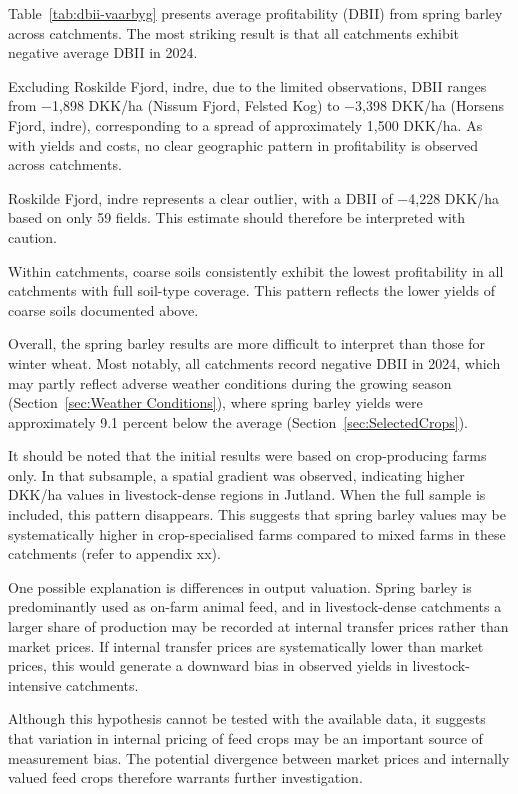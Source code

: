 \documentclass[12pt]{article}
\begin{document}
Table~\ref{tab:dbii-vaarbyg} presents average profitability (DBII) from spring barley across catchments. The most striking result is that all catchments exhibit negative average DBII in 2024. 

Excluding Roskilde Fjord, indre, due to the limited observations, DBII ranges from −1,898 DKK/ha (Nissum Fjord, Felsted Kog) to −3,398 DKK/ha (Horsens Fjord, indre), corresponding to a spread of approximately 1,500 DKK/ha. As with yields and costs, no clear geographic pattern in profitability is observed across catchments.

Roskilde Fjord, indre represents a clear outlier, with a DBII of −4,228 DKK/ha based on only 59 fields. This estimate should therefore be interpreted with caution.

Within catchments, coarse soils consistently exhibit the lowest profitability in all catchments with full soil-type coverage. This pattern reflects the lower yields of coarse soils documented above.

Overall, the spring barley results are more difficult to interpret than those for winter wheat. Most notably, all catchments record negative DBII in 2024, which may partly reflect adverse weather conditions during the growing season (Section~\ref{sec:Weather Conditions}), where spring barley yields were approximately 9.1 percent below the average (Section~\ref{sec:SelectedCrops}). 

 

It should be noted that the initial results were based on crop-producing farms only. In that subsample, a spatial gradient was  observed, indicating higher DKK/ha values in livestock-dense regions in Jutland. When the full sample is included, this pattern disappears. This suggests that spring barley values may be systematically higher in crop-specialised farms compared to mixed farms in these catchments (refer to appendix xx).

One possible explanation is differences in output valuation. Spring barley is predominantly used as on-farm animal feed, and in livestock-dense catchments a larger share of production may be recorded at internal transfer prices rather than market prices. If internal transfer prices are systematically lower than market prices, this would generate a downward bias in observed yields in livestock-intensive catchments.

Although this hypothesis cannot be tested with the available data, it suggests that variation in internal pricing of feed crops may be an important source of measurement bias. The potential divergence between market prices and internally valued feed crops therefore warrants further investigation.  
\end{document}

